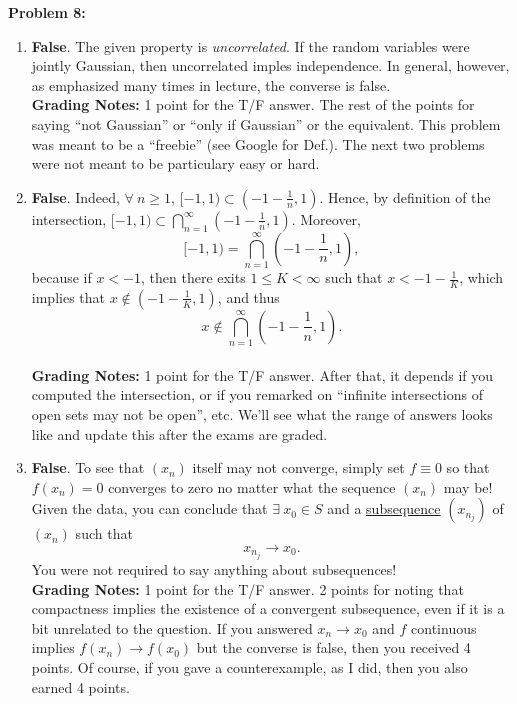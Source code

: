 \documentclass[letterpaper]{article}
\begin{document}
\noindent \textbf{Problem 8:}
\begin{enumerate}
    \setlength{\itemsep}{.15in}
    \renewcommand{\labelenumi}{(\alph{enumi})}
    \setlength{\itemsep}{.1in}
  \item \textbf{False}. The given property is \textit{uncorrelated}. If the random variables were jointly Gaussian, then uncorrelated imples independence. In general, however, as emphasized many times in lecture, the converse is false. \\

      \textbf{Grading Notes:} 1 point for the T/F answer. The rest of the points for saying ``not Gaussian'' or ``only if Gaussian'' or the equivalent. This problem was meant to be a ``freebie'' (see Google for Def.). The next two problems were not meant to be particulary easy or hard.

  \item \textbf{False}. Indeed, $\forall~n\ge 1$, $[-1,1) \subset (-1- \frac{1}{n}, 1)$. Hence, by definition of the intersection, $[-1,1) \subset \bigcap\limits_{n=1}^{\infty} (-1- \frac{1}{n}, 1)$. Moreover, $$[-1,1) = \bigcap\limits_{n=1}^{\infty} (-1- \frac{1}{n}, 1), $$
      because if $x<-1$, then there exits $1\le K<\infty$ such that $x < -1-\frac{1}{K}$, which implies that $x\not \in  (-1- \frac{1}{K}, 1)$, and thus
      $$ x \not \in \bigcap\limits_{n=1}^{\infty} (-1- \frac{1}{n}, 1). $$\\



      \textbf{Grading Notes:} 1 point for the T/F answer. After that, it depends if you computed the intersection, or if you remarked on ``infinite intersections of open sets may not be open'', etc. We'll see what the range of answers looks like and update this after the exams are graded.

  \item \textbf{False}.
  To see that $(x_n)$ itself may not converge, simply set $f\equiv0$ so that $f(x_n)=0$ converges to zero no matter what the sequence $(x_n)$ may be! Given the data, you can conclude that $\exists~x_0 \in S$ and a \underline{subsequence} $(x_{n_j})$ of $(x_n)$ such that
  $$x_{n_j} \to x_0.$$ You were not required to say anything about subsequences!
      \\

      \textbf{Grading Notes:} 1 point for the T/F answer. 2 points for noting that compactness implies the existence of a convergent subsequence, even if it is  a bit unrelated to the question. If you answered $x_n\to x_0$ and $f$ continuous implies $f(x_n) \to f(x_0)$ but the converse is false, then you received 4 points. Of course, if you gave a counterexample, as I did, then you also earned 4 points.
\end{enumerate}
\end{document}
